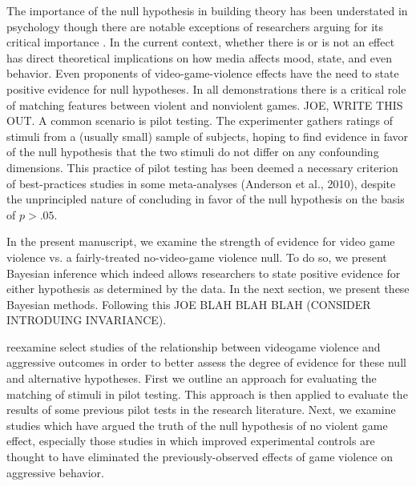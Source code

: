 \documentclass[fignum,nobf,man]{apa}
\begin{document}
The importance of the null hypothesis in building theory has been understated in psychology though there are notable exceptions of researchers arguing for its critical importance \citep{Gallistel:2009,Rouder:etal:2009a}.  In the current context, whether there is or is not an effect has direct theoretical implications on how media affects mood, state, and even behavior.  Even proponents of video-game-violence effects have the need to state positive evidence for null hypotheses.  In all demonstrations there is a critical role of matching features between violent and nonviolent games.  JOE, WRITE THIS OUT.  A common scenario is pilot testing. The experimenter gathers ratings of stimuli from a (usually small) sample of subjects, hoping to find evidence in favor of the null hypothesis that the two stimuli do not differ on any confounding dimensions. This practice of pilot testing has been deemed a necessary criterion of best-practices studies in some meta-analyses (Anderson et al., 2010), despite the unprincipled nature of concluding in favor of the null hypothesis on the basis of $p > .05$.

In the present manuscript, we examine the strength of evidence for video game violence vs. a fairly-treated no-video-game violence null.  To do so, we present Bayesian inference which indeed allows researchers to state positive evidence for either hypothesis as determined by the data.  In the next section, we present these Bayesian methods.  Following this JOE BLAH BLAH BLAH (CONSIDER INTRODUING INVARIANCE).

reexamine select studies of the relationship between videogame violence and aggressive outcomes in order to better assess the degree of evidence for these null and alternative hypotheses. First we outline an approach for evaluating the matching of stimuli in pilot testing. This approach is then applied to evaluate the results of some previous pilot tests in the research literature. Next, we examine studies which have argued the truth of the null hypothesis of no violent game effect, especially those studies in which improved experimental controls are thought to have eliminated the previously-observed effects of game violence on aggressive behavior. 
\end{document}
